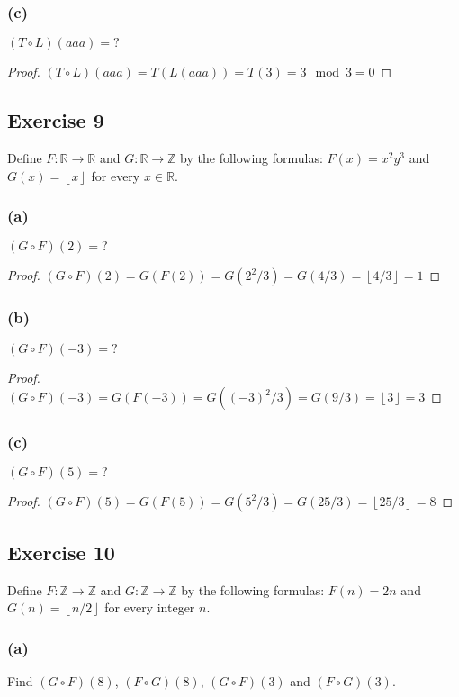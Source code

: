 \documentclass[14pt]{extarticle}
\newcommand{\R}{\mathbb{R}}
\newcommand{\Z}{\mathbb{Z}}
\newcommand{\floor}[1]{{\left\lfloor#1\right\rfloor}}
\begin{document}
\subsubsection{(c)}
\((T \circ L)(aaa) = ?\)

\begin{proof}
    \((T \circ L)(aaa) = T(L(aaa)) = T(3) = 3 \mod 3 = 0\)
\end{proof}

\subsection{Exercise 9}
Define \(F: \R \to \R\) and \(G: \R \to \Z\) by the following formulas: \(F(x) = x^2y^3\) and
\(G(x) = \floor{x}\) for every \(x \in \R\).

\subsubsection{(a)}
\((G \circ F)(2) = ?\)

\begin{proof}
    \((G \circ F)(2) = G(F(2)) = G(2^2/3) = G(4/3) = \floor{4/3} = 1\)
\end{proof}

\subsubsection{(b)}
\((G \circ F)(-3) = ?\)

\begin{proof}
    \((G \circ F)(-3) = G(F(-3)) = G((-3)^2/3) = G(9/3) = \floor{3} = 3\)
\end{proof}

\subsubsection{(c)}
\((G \circ F)(5) = ?\)

\begin{proof}
    \((G \circ F)(5) = G(F(5)) = G(5^2/3) = G(25/3) = \floor{25/3} = 8\)
\end{proof}

\subsection{Exercise 10}
Define \(F: \Z \to \Z\) and \(G: \Z \to \Z\) by the following formulas: \(F(n) = 2n\) and \(G(n)=\floor{n/2}\)
for every integer $n$.

\subsubsection{(a)}
Find \((G \circ F)(8)\), \((F \circ G)(8)\), \((G \circ F)(3)\) and \((F \circ G)(3)\).
\end{document}
